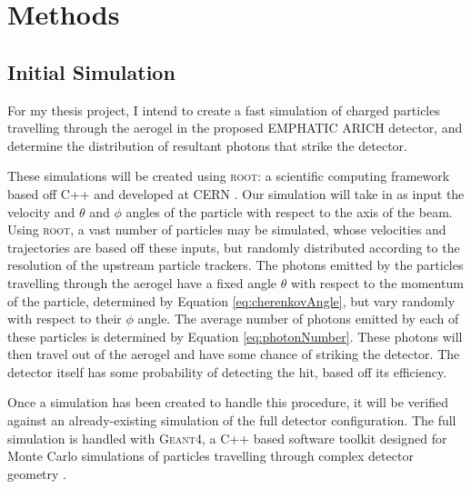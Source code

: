 
\chapter{Methods}
\label{ch:Methods}

\section{Initial Simulation}
\label{sec:experiment}
For my thesis project, I intend to create a fast simulation of charged particles travelling through the aerogel in the proposed \ac{EMPHATIC} \ac{ARICH} detector, and determine the distribution of resultant photons that strike the detector. 

These simulations will be created using \textsc{root}: a scientific computing framework based off C++ and developed at CERN \cite{root}. Our simulation will take in as input the velocity and $\theta$ and $\phi$ angles of the particle with respect to the axis of the beam. Using \textsc{root}, a vast number of particles may be simulated, whose velocities and trajectories are based off these inputs, but randomly distributed according to the resolution of the upstream particle trackers. The photons emitted by the particles travelling through the aerogel have a fixed angle $\theta$ with respect to the momentum of the particle, determined by Equation \ref{eq:cherenkovAngle}, but vary randomly with respect to their $\phi$ angle. The average number of photons emitted by each of these particles is determined by Equation \ref{eq:photonNumber}. These photons will then travel out of the aerogel and have some chance of striking the detector. The detector itself has some probability of detecting the hit, based off its efficiency. 

Once a simulation has been created to handle this procedure, it will be verified against an already-existing simulation of the full detector configuration. The full simulation is handled with \textsc{Geant4}, a C++ based software toolkit designed for Monte Carlo simulations of particles travelling through complex detector geometry  \cite{geant4}.

